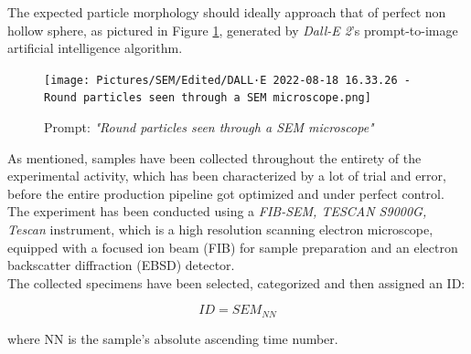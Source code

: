 \documentclass{article}
\begin{document}
        The expected particle morphology should ideally approach that of perfect non hollow sphere, as pictured in Figure \ref{fig:SEM_DALLE2}, generated by \textit{Dall-E 2}'s 
        prompt-to-image artificial intelligence algorithm. 

            \begin{figure}[ht]
                \centering
                \texttt{[image: Pictures/SEM/Edited/DALL·E 2022-08-18 16.33.26 - Round particles seen through a SEM microscope.png]}
                \caption{Prompt: \textit{"Round particles seen through a SEM microscope"}}
                \label{fig:SEM_DALLE2}
            \end{figure}

            \clearpage

            As mentioned, samples have been collected throughout the entirety of the experimental activity, which has been characterized by a lot of trial and error, 
            before the entire production pipeline got optimized and 
            under perfect control. \\ 

            The experiment has been conducted using a \textit{FIB-SEM, TESCAN S9000G, Tescan} instrument, which is a high resolution 
            scanning electron microscope, equipped with a focused ion beam (FIB) for sample preparation and 
            an electron backscatter diffraction (EBSD) detector. \\

            The collected specimens have been selected, categorized and then assigned an ID:

            \begin{equation}
                ID = SEM_{NN}
                \label{eq:SEM_ID}
            \end{equation}

            where NN is the sample's absolute ascending time number. \\ 


\end{document}
